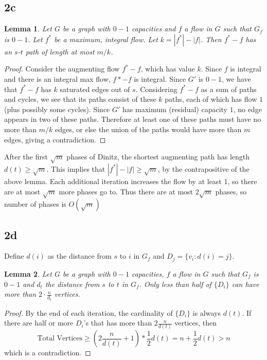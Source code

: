 \documentclass{article}
\newtheorem{lemma}{Lemma}
\begin{document}
\subsection*{2c}

\begin{lemma} Let $G$ be a graph with $0-1$ capacities and $f$ a flow in $G$
such that $G_f$ is $0-1$. Let $f^*$ be a maximum, integral flow. Let $k=|f^*| -
|f|$.  Then $f^*-f$ has an $s$-$t$ path of length at most
$m/k$. \end{lemma}
\begin{proof}
Consider the augmenting flow $f^* - f$, which has value $k$. Since $f$ is
integral and there is an integral max flow, $f*-f$ is integral. Since $G'$ is
$0-1$, we have that $f^* - f$ has $k$ saturated edges out of $s$. Considering
$f^* - f$ as a sum of paths and cycles, we see that its paths consist of these
$k$ paths, each of which has flow $1$ (plus possibly some cycles). Since $G'$
has maximum (residual) capacity $1$, no edge appears in two of these paths.
Therefore at least one of these paths must have no more than $m/k$ edges, or
else the union of the paths would have more than $m$ edges, giving a
contradiction.
\end{proof}

After the first $\sqrt{m}$ phases of Dinitz, the shortest augmenting path has length
$d(t) \geq \sqrt{m}$. This implies that $|f^*| - |f| \geq \sqrt{m}$, by the
contrapositive of the above lemma. Each
additional iteration increases the flow by at least 1, so there are at most
$\sqrt{m}$ more phases go to. Thus there are at most $2\sqrt{m}$ phases,
so number of phases is $O(\sqrt{m})$

\subsection*{2d}

Define $d(i)$ as the distance from $s$ to $i$ in $G_f$ and $D_j = \{v_i: d(i) = j \}$. 
\begin{lemma} Let $G$ be a graph with $0-1$ capacities, $f$ a flow in $G$ such that 
$G_f$ is $0-1$ and $d_t$ the distance from $s$ to $t$ in $G_f$. Only less than half 
of $\{D_i\}$ can have more than $2\cdot \frac{n}{d_t}$ vertices.\end{lemma}
\begin{proof}
By the end of each iteration, the cardinality of $\{D_i\}$ is always $d(t)$. 
If there are half or more $D_i$'s that has more than $2\frac{n}{d(t)}$ vertices, 
then $$\text{Total Vertices} \geq (2\frac{n}{d(t)} + 1) * \frac{1}{2} d(t) 
= n + \frac{1}{2} d(t) > n$$ which is a contradiction. 
\end{proof}
\end{document}
